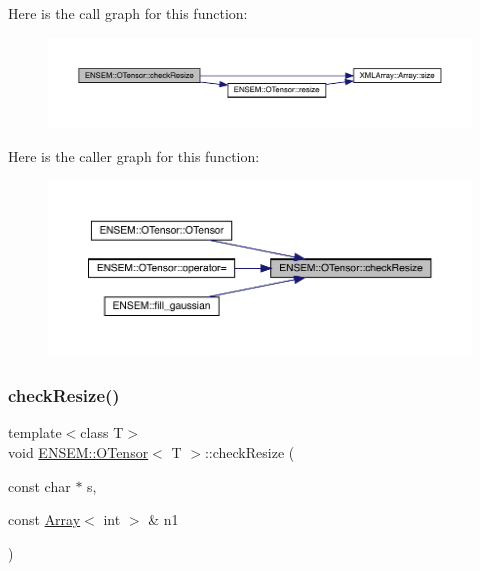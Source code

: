 Here is the call graph for this function\+:
\nopagebreak
\begin{figure}[H]
\begin{center}
\leavevmode
\includegraphics[width=350pt]{da/d8a/classENSEM_1_1OTensor_aa273eae7f1de4b37e91302da5edf279b_cgraph}
\end{center}
\end{figure}
Here is the caller graph for this function\+:
\nopagebreak
\begin{figure}[H]
\begin{center}
\leavevmode
\includegraphics[width=350pt]{da/d8a/classENSEM_1_1OTensor_aa273eae7f1de4b37e91302da5edf279b_icgraph}
\end{center}
\end{figure}
\mbox{\label{classENSEM_1_1OTensor_aa273eae7f1de4b37e91302da5edf279b}} 
\subsubsection{\texorpdfstring{checkResize()}{checkResize()}\hspace{0.1cm}{\footnotesize\ttfamily [2/6]}}
{\footnotesize\ttfamily template$<$class T$>$ \\
void \mbox{\hyperlink{classENSEM_1_1OTensor}{E\+N\+S\+E\+M\+::\+O\+Tensor}}$<$ T $>$\+::check\+Resize (\begin{DoxyParamCaption}\item[{const char $\ast$}]{s,  }\item[{const \mbox{\hyperlink{classXMLArray_1_1Array}{Array}}$<$ int $>$ \&}]{n1 }\end{DoxyParamCaption})\hspace{0.3cm}{\ttfamily [inline]}}

